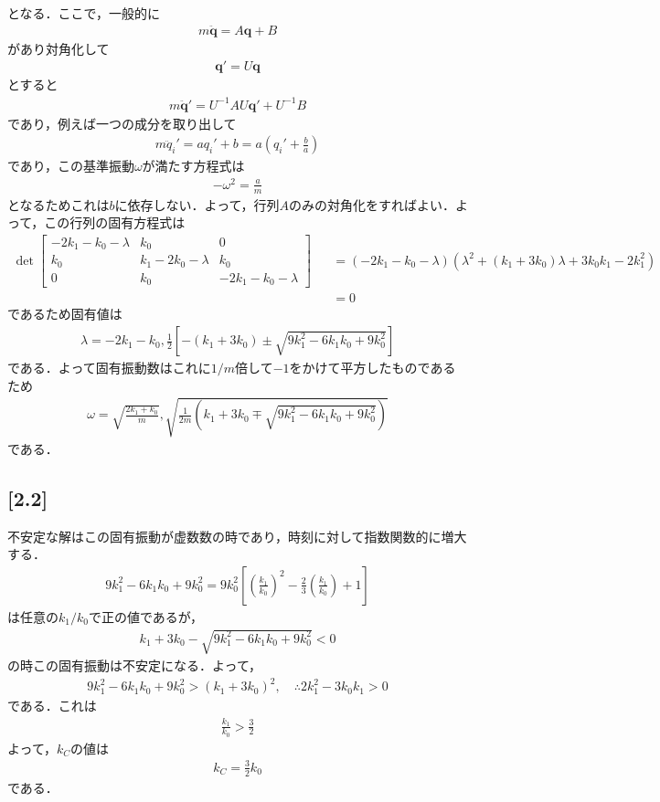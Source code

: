 \documentclass[12pt,dvipdfmx]{jsarticle}
\begin{document}
となる．ここで，一般的に
\begin{eqnarray}
  m\ddot{\bm{q}} = A\bm{q} + B
\end{eqnarray}
があり対角化して
\begin{eqnarray}
  \bm{q}' = U\bm{q}
\end{eqnarray}
とすると
\begin{eqnarray}
  m\ddot{\bm{q}}' = U^{-1}AU \bm{q}' + U^{-1}B
\end{eqnarray}
であり，例えば一つの成分を取り出して
\begin{eqnarray}
  m\ddot{q}_i' = a q_i' + b = a\left( q_i' + \frac{b}{a} \right)
\end{eqnarray}
であり，この基準振動$\omega$が満たす方程式は
\begin{eqnarray}
  -\omega^2 = \frac{a}{m}
\end{eqnarray}
となるためこれは$b$に依存しない．よって，行列$A$のみの対角化をすればよい．よって，この行列の固有方程式は
\begin{eqnarray*}
  \det
  \begin{bmatrix}
    -2k_1-k_0-\lambda & k_0 & 0\\
    k_0 & k_1-2k_0-\lambda & k_0\\
    0 & k_0 & -2k_1-k_0-\lambda
  \end{bmatrix}
  &&= \left( -2k_1-k_0-\lambda \right)\left( \lambda^2+(k_1+3k_0)\lambda + 3k_0k_1 -2k_1^2 \right)\\
  &&=0
\end{eqnarray*}
であるため固有値は
\begin{eqnarray}
  \lambda = -2k_1-k_0, \frac{1}{2}\left[ -(k_1+3k_0) \pm \sqrt{ 9k_1^2-6k_1k_0 + 9k_0^2 } \right]
\end{eqnarray}
である．よって固有振動数はこれに$1/m$倍して$-1$をかけて平方したものであるため
\begin{eqnarray}
  \omega = \sqrt{ \frac{2k_1+k_0}{m} }, \sqrt{ \frac{1}{2m}\left( k_1+3k_0 \mp \sqrt{ 9k_1^2-6k_1k_0 + 9k_0^2 } \right) }
\end{eqnarray}
である．
\subsection*{\large{[2.2]}}
不安定な解はこの固有振動が虚数数の時であり，時刻に対して指数関数的に増大する．
\begin{eqnarray}
  9k_1^2-6k_1k_0 + 9k_0^2 = 9k_0^2\left[ \left( \frac{k_1}{k_0} \right)^2 -\frac{2}{3}\left( \frac{k_1}{k_0} \right)+1 \right]
\end{eqnarray}
は任意の$k_1/k_0$で正の値であるが，
\begin{eqnarray}
  k_1+3k_0 - \sqrt{ 9k_1^2-6k_1k_0 + 9k_0^2 } <0
\end{eqnarray}
の時この固有振動は不安定になる．よって，
\begin{eqnarray}
  9k_1^2-6k_1k_0 + 9k_0^2 > \left( k_1+3k_0\right)^2,\quad\therefore 2k_1^2-3k_0k_1>0
\end{eqnarray}
である．これは
\begin{eqnarray}
  \frac{k_1}{k_0}>\frac{3}{2}
\end{eqnarray}
よって，$k_C$の値は
\begin{eqnarray}
  k_C = \frac{3}{2}k_0
\end{eqnarray}
である．
\end{document}
